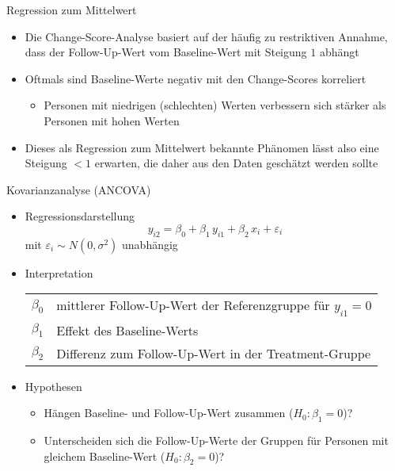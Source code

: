 \documentclass{beamer}
\begin{document}
\begin{frame}{Regression zum Mittelwert}
\begin{itemize}
  \item Die Change-Score-Analyse basiert auf der häufig zu restriktiven Annahme, dass der Follow-Up-Wert vom Baseline-Wert mit Steigung $1$ abhängt
  \item Oftmals sind Baseline-Werte negativ mit den Change-Scores korreliert
    \begin{itemize}
      \item Personen mit niedrigen (schlechten) Werten verbessern sich stärker als Personen mit hohen Werten
    \end{itemize}
  \item Dieses als Regression zum Mittelwert bekannte Phänomen lässt also eine Steigung $< 1$ erwarten, die daher aus den Daten geschätzt werden sollte
\end{itemize}
\end{frame}

\begin{frame}{Kovarianzanalyse (ANCOVA)}
\begin{itemize}
  \item Regressionsdarstellung
    {\color{iwmorange}\[
      y_{i2} = \beta_0 + \beta_1 \, y_{i1} + \beta_2 \, x_i + \varepsilon_i
    \]}
    mit $\varepsilon_i \sim N(0, \sigma^2)$ unabhängig
  \item Interpretation
    \begin{center}
    \begin{tabular}{lp{10cm}}
    $\beta_0$ & mittlerer Follow-Up-Wert der Referenzgruppe für $y_{i1} = 0$\\
    $\beta_1$ & Effekt des Baseline-Werts\\
    $\beta_2$ & Differenz zum Follow-Up-Wert in der Treatment-Gruppe
    \end{tabular}
    \end{center}
  \item Hypothesen
    \begin{itemize}
        \item Hängen Baseline- und Follow-Up-Wert zusammen ($H_0\colon \beta_1 = 0$)?
        \item Unterscheiden sich die Follow-Up-Werte der Gruppen für Personen mit gleichem Baseline-Wert ($H_0\colon \beta_2 = 0$)?
    \end{itemize}
\end{itemize}
\end{frame}
\end{document}

